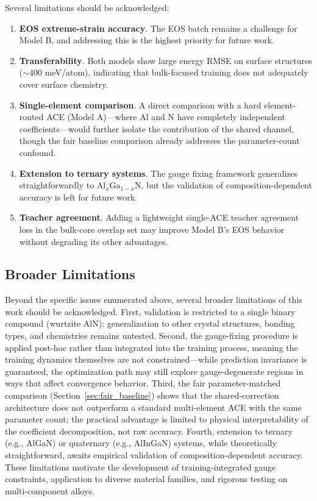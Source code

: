 \documentclass[twoside,prb,aps,floatfix,superscriptaddress,longbibliography]{revtex4-2}
\begin{document}
Several limitations should be acknowledged:
\begin{enumerate}
    \item \textbf{EOS extreme-strain accuracy}. The EOS batch remains a challenge for Model B, and addressing this is the highest priority for future work.
    \item \textbf{Transferability}. Both models show large energy RMSE on surface structures ($\sim 400$ meV/atom), indicating that bulk-focused training does not adequately cover surface chemistry.
    \item \textbf{Single-element comparison}. A direct comparison with a hard element-routed ACE (Model A)---where Al and N have completely independent coefficients---would further isolate the contribution of the shared channel, though the fair baseline comparison already addresses the parameter-count confound.
    \item \textbf{Extension to ternary systems}. The gauge fixing framework generalizes straightforwardly to $\mathrm{Al}_x\mathrm{Ga}_{1-x}\mathrm{N}$, but the validation of composition-dependent accuracy is left for future work.
    \item \textbf{Teacher agreement}. Adding a lightweight single-ACE teacher agreement loss in the bulk-core overlap set may improve Model B's EOS behavior without degrading its other advantages.
\end{enumerate}

\subsection{Broader Limitations}

Beyond the specific issues enumerated above, several broader limitations of this work should be acknowledged. First, validation is restricted to a single binary compound (wurtzite AlN); generalization to other crystal structures, bonding types, and chemistries remains untested. Second, the gauge-fixing procedure is applied post-hoc rather than integrated into the training process, meaning the training dynamics themselves are not constrained---while prediction invariance is guaranteed, the optimization path may still explore gauge-degenerate regions in ways that affect convergence behavior. Third, the fair parameter-matched comparison (Section~\ref{sec:fair_baseline}) shows that the shared-correction architecture does not outperform a standard multi-element ACE with the same parameter count; the practical advantage is limited to physical interpretability of the coefficient decomposition, not raw accuracy. Fourth, extension to ternary (e.g., AlGaN) or quaternary (e.g., AlInGaN) systems, while theoretically straightforward, awaits empirical validation of composition-dependent accuracy. These limitations motivate the development of training-integrated gauge constraints, application to diverse material families, and rigorous testing on multi-component alloys.
\end{document}

